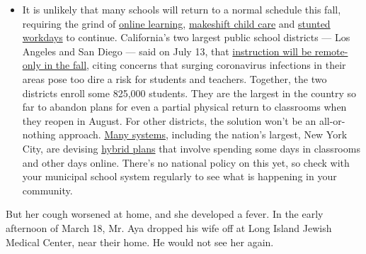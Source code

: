 \begin{itemize}
  \begin{itemize}
  \tightlist
  \item
    It is unlikely that many schools will return to a normal schedule
    this fall, requiring the grind of
    \href{https://www.nytimes.com/2020/06/05/us/coronavirus-education-lost-learning.html?action=click\&pgtype=Article\&state=default\&region=MAIN_CONTENT_3\&context=storylines_faq}{online
    learning},
    \href{https://www.nytimes.com/2020/05/29/us/coronavirus-child-care-centers.html?action=click\&pgtype=Article\&state=default\&region=MAIN_CONTENT_3\&context=storylines_faq}{makeshift
    child care} and
    \href{https://www.nytimes.com/2020/06/03/business/economy/coronavirus-working-women.html?action=click\&pgtype=Article\&state=default\&region=MAIN_CONTENT_3\&context=storylines_faq}{stunted
    workdays} to continue. California's two largest public school
    districts --- Los Angeles and San Diego --- said on July 13, that
    \href{https://www.nytimes.com/2020/07/13/us/lausd-san-diego-school-reopening.html?action=click\&pgtype=Article\&state=default\&region=MAIN_CONTENT_3\&context=storylines_faq}{instruction
    will be remote-only in the fall}, citing concerns that surging
    coronavirus infections in their areas pose too dire a risk for
    students and teachers. Together, the two districts enroll some
    825,000 students. They are the largest in the country so far to
    abandon plans for even a partial physical return to classrooms when
    they reopen in August. For other districts, the solution won't be an
    all-or-nothing approach.
    \href{https://bioethics.jhu.edu/research-and-outreach/projects/eschool-initiative/school-policy-tracker/}{Many
    systems}, including the nation's largest, New York City, are
    devising
    \href{https://www.nytimes.com/2020/06/26/us/coronavirus-schools-reopen-fall.html?action=click\&pgtype=Article\&state=default\&region=MAIN_CONTENT_3\&context=storylines_faq}{hybrid
    plans} that involve spending some days in classrooms and other days
    online. There's no national policy on this yet, so check with your
    municipal school system regularly to see what is happening in your
    community.
  \end{itemize}
\end{itemize}

But her cough worsened at home, and she developed a fever. In the early
afternoon of March 18, Mr. Aya dropped his wife off at Long Island
Jewish Medical Center, near their home. He would not see her again.

